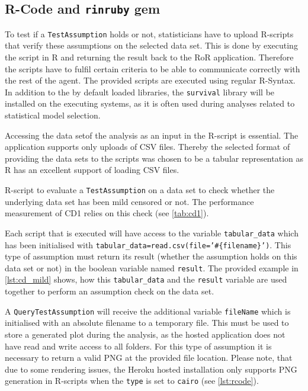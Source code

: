 \subsection{R-Code and \texttt{rinruby} gem}
\label{sec:r_code}

To test if a \texttt{TestAssumption} holds or not, statisticians have to upload \gls{R}-scripts that verify these assumptions on the selected data set. This is done by executing the script in \gls{R} and returning the result back to the \gls{RoR} application. Therefore the scripts have to fulfil certain criteria to be able to communicate correctly with the rest of the agent. The provided scripts are executed using regular R-Syntax. In addition to the by default loaded libraries, the \texttt{survival} library will be installed on the executing systems, as it is often used during analyses related to statistical model selection.

Accessing the data setof the analysis as an input in the R-script is essential. The application supports only uploads of CSV files. Thereby the selected format of providing the data sets to the scripts was chosen to be a tabular representation as \gls{R} has an excellent support of loading CSV files.

\begin{listing}[htbp]
	\caption{R-script to evaluate a \texttt{TestAssumption} on a data set to check whether the underlying data set has been mild censored or not. The performance measurement of CD1 relies on this check (see \autoref{tab:cd1}). }
	\label{lst:cd_mild}
\end{listing}


Each script that is executed will have access to the variable \texttt{tabular\_data} which has been initialised with \texttt{tabular\_data=read.csv(file='\#\{filename\}')}. This type of assumption must return its result (whether the assumption holds on this data set or not) in the boolean variable named \texttt{result}. The provided example in \cref{lst:cd_mild} shows, how this \texttt{tabular\_data} and the \texttt{result} variable are used together to perform an assumption check on the data set.

A \texttt{QueryTestAssumption} will receive the additional variable \texttt{fileName} which is initialised with an absolute filename to a temporary file. This must be used to store a generated plot during the analysis, as the hosted application does not have read and write access to all folders. For this type of assumption it is necessary to return a valid PNG at the provided file location. Please note, that due to some rendering issues, the Heroku hosted installation only supports PNG generation in R-scripts when the \texttt{type} is set to \texttt{cairo} (see \cref{lst:rcode}).

